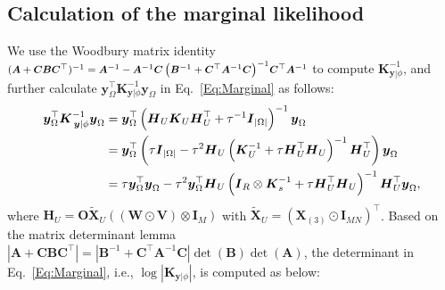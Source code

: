 \documentclass[12pt]{article}
\newcommand{\bd}[1]{\boldsymbol{#1}}
\begin{document}
\subsection{Calculation of the marginal likelihood}\label{appA}

We use the Woodbury matrix identity ${\footnotesize{(\boldsymbol{A}+\boldsymbol{C}\boldsymbol{B}\boldsymbol{C}^{\top})^{-1}=\boldsymbol{A}^{-1}-\boldsymbol{A}^{-1}\boldsymbol{C}\left(\boldsymbol{B}^{-1}+\boldsymbol{C}^{\top}\boldsymbol{A}^{-1}\boldsymbol{C}\right)^{-1}}}\\{\footnotesize{\boldsymbol{C}^{\top}\boldsymbol{A}^{-1}}}$ to compute $\boldsymbol{K}_{\left.\boldsymbol{y}\right|\phi}^{-1}$, and further calculate $\boldsymbol{y}_{\Omega}^{\top}\boldsymbol{K}_{\left.\boldsymbol{y}\right|\phi}^{-1}\boldsymbol{y}_{\Omega}$ in Eq.~\eqref{Eq:Marginal} as follows:
\begin{equation}\notag
\begin{aligned}
\boldsymbol{y}_{\Omega}^{\top}\boldsymbol{K}_{\left.\boldsymbol{y}\right|\phi}^{-1}\boldsymbol{y}_{\Omega}&=\boldsymbol{y}_{\Omega}^{\top}\left(\boldsymbol{H}_{U}\boldsymbol{K}_{U}\boldsymbol{H}_{U}^{\top}+\tau^{-1}\boldsymbol{I}_{|\Omega|}\right)^{-1}\boldsymbol{y}_{\Omega} \\
&=\boldsymbol{y}_{\Omega}^{\top}\left(\tau\boldsymbol{I}_{|\Omega|}-\tau^2\boldsymbol{H}_{U}\left(\boldsymbol{K}_{U}^{-1}+\tau\boldsymbol{H}_{U}^{\top}\boldsymbol{H}_{U}\right)^{-1}\boldsymbol{H}_{U}^{\top}\right)\boldsymbol{y}_{\Omega} \\
&=\tau\boldsymbol{y}_{\Omega}^{\top}\boldsymbol{y}_{\Omega}-\tau^2\boldsymbol{y}_{\Omega}^{\top}\boldsymbol{H}_{U}\left(\boldsymbol{I}_{R}\otimes\boldsymbol{K}_{s}^{-1}+\tau\boldsymbol{H}_{U}^{\top}\boldsymbol{H}_{U}\right)^{-1}\boldsymbol{H}_{U}^{\top}\boldsymbol{y}_{\Omega},
\end{aligned}
\end{equation}
where $\boldsymbol{H}_{U}=\boldsymbol{O}\tilde{\bd{X}}_{U}\left((\boldsymbol{W}\odot\boldsymbol{V})\otimes\boldsymbol{I}_{M}\right)$ with $\tilde{\boldsymbol{X}}_{U}=\left(\boldsymbol{X}_{(3)}\odot\boldsymbol{I}_{MN}\right)^{\top}$. Based on the matrix determinant lemma $\left|\boldsymbol{A}+\boldsymbol{C}\boldsymbol{B}\boldsymbol{C}^{\top}\right|=\left|\boldsymbol{B}^{-1}+\boldsymbol{C}^{\top}\boldsymbol{A}^{-1}\boldsymbol{C}\right|\det{(\boldsymbol{B})}\det{(\boldsymbol{A})}$, the determinant in Eq.~\eqref{Eq:Marginal}, i.e., $\log{\left|\boldsymbol{K}_{\left.\boldsymbol{y}\right|\phi}\right|}$, is computed as below:
\end{document}
